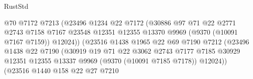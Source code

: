\begin{lexlean}{RustStd}
\begin{coremodule}
                                      @70
                                      @7172
                                      @7213
                                      (@23496
                                        @1234
                                        @22
                                        @7172
                                        (@30886
                                          @97
                                          @71
                                          @22
                                          @2771
                                          @2743
                                          @7158
                                          @7167
                                          @23548
                                          @12351
                                          @12355
                                          @13370
                                          @9969
                                          (@9370 (@10091 @7167 @7159))
                                          @12024))
                                      (@23516
                                        @1438
                                        @1965
                                        @22
                                        @69
                                        @7190
                                        @7212
                                        (@23496
                                          @1438
                                          @22
                                          @7190
                                          (@30919
                                            @19
                                            @71
                                            @22
                                            @3062
                                            @2743
                                            @7177
                                            @7185
                                            @30929
                                            @12351
                                            @12355
                                            @13337
                                            @9969
                                            (@9370 (@10091 @7185 @7178))
                                            @12024))
                                        (@23516
                                          @1440
                                          @158
                                          @22
                                          @27
                                          @7210

\end{coremodule}
\end{lexlean}
